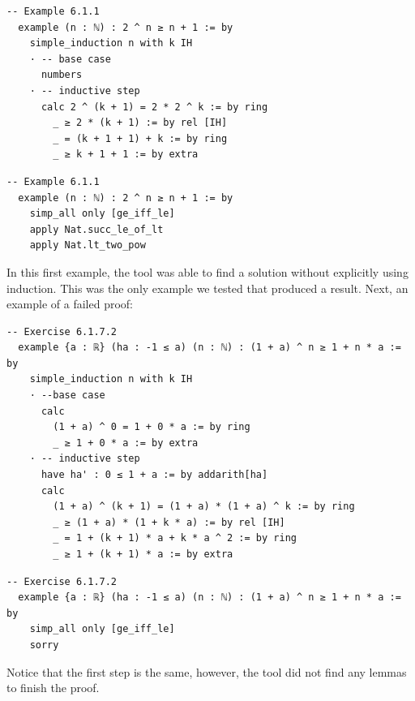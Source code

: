 \documentclass[12pt]{article}
\newcommand{\leancopilot}{\texttt{LeanCopilot} }
\begin{document}
\begin{minipage}{0.495\textwidth}
  \begin{lstlisting}[title={Human proof}]
  -- Example 6.1.1
  example (n : ℕ) : 2 ^ n ≥ n + 1 := by
    simple_induction n with k IH
    · -- base case
      numbers
    · -- inductive step
      calc 2 ^ (k + 1) = 2 * 2 ^ k := by ring
        _ ≥ 2 * (k + 1) := by rel [IH]
        _ = (k + 1 + 1) + k := by ring
        _ ≥ k + 1 + 1 := by extra
  \end{lstlisting}
\end{minipage}
\vline
\begin{minipage}{0.495\textwidth}
  \begin{lstlisting}[title={\leancopilot proof}]
  -- Example 6.1.1
  example (n : ℕ) : 2 ^ n ≥ n + 1 := by
    simp_all only [ge_iff_le]
    apply Nat.succ_le_of_lt
    apply Nat.lt_two_pow
  \end{lstlisting}
\end{minipage}

In this first example, the tool was able to find a solution without explicitly using induction. This was the only example we tested that produced a result. Next, an example of a failed proof:

\begin{minipage}{0.495\textwidth}
  \begin{lstlisting}[title={Human proof}]
  -- Exercise 6.1.7.2
  example {a : ℝ} (ha : -1 ≤ a) (n : ℕ) : (1 + a) ^ n ≥ 1 + n * a := by
    simple_induction n with k IH
    · --base case
      calc
        (1 + a) ^ 0 = 1 + 0 * a := by ring
        _ ≥ 1 + 0 * a := by extra
    · -- inductive step
      have ha' : 0 ≤ 1 + a := by addarith[ha]
      calc
        (1 + a) ^ (k + 1) = (1 + a) * (1 + a) ^ k := by ring
        _ ≥ (1 + a) * (1 + k * a) := by rel [IH]
        _ = 1 + (k + 1) * a + k * a ^ 2 := by ring
        _ ≥ 1 + (k + 1) * a := by extra
  \end{lstlisting}
\end{minipage}
\vline
\begin{minipage}{0.495\textwidth}
  \begin{lstlisting}[title={\leancopilot proof}]
  -- Exercise 6.1.7.2
  example {a : ℝ} (ha : -1 ≤ a) (n : ℕ) : (1 + a) ^ n ≥ 1 + n * a := by
    simp_all only [ge_iff_le]
    sorry
  \end{lstlisting}
\end{minipage}

Notice that the first step is the same, however, the tool did not find any lemmas to finish the proof.
\end{document}

